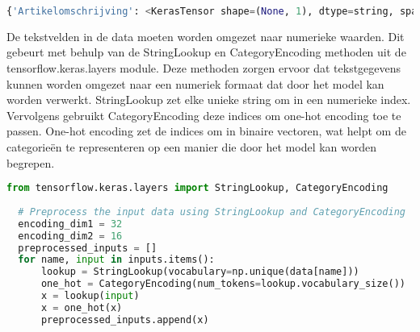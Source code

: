 \begin{lstlisting}[language=Python, caption={Uitkomst van de dictionary}]
  {'Artikelomschrijving': <KerasTensor shape=(None, 1), dtype=string, sparse=None, name=Artikelomschrijving>, 'Artikelomschrijving.1': <KerasTensor shape=(None, 1), dtype=string, sparse=None, name=Artikelomschrijving.1>, 'Voorts.gem.prijs': <KerasTensor shape=(None, 1), dtype=string, sparse=None, name=Voorts.gem.prijs>}
\end{lstlisting}

De tekstvelden in de data moeten worden omgezet naar numerieke waarden. Dit gebeurt met behulp van de StringLookup en CategoryEncoding methoden uit de tensorflow.keras.layers module. Deze methoden zorgen ervoor dat tekstgegevens kunnen worden omgezet naar een numeriek formaat dat door het model kan worden verwerkt. StringLookup zet elke unieke string om in een numerieke index. Vervolgens gebruikt CategoryEncoding deze indices om one-hot encoding toe te passen. One-hot encoding zet de indices om in binaire vectoren, wat helpt om de categorieën te representeren op een manier die door het model kan worden begrepen.
\begin{lstlisting}[language=Python, caption={Omzetten van tekstvelden naar numerieke waarden}]
  from tensorflow.keras.layers import StringLookup, CategoryEncoding
  
  # Preprocess the input data using StringLookup and CategoryEncoding
  encoding_dim1 = 32
  encoding_dim2 = 16
  preprocessed_inputs = []
  for name, input in inputs.items():
      lookup = StringLookup(vocabulary=np.unique(data[name]))
      one_hot = CategoryEncoding(num_tokens=lookup.vocabulary_size())
      x = lookup(input)
      x = one_hot(x)
      preprocessed_inputs.append(x)
\end{lstlisting}


\section{}%
\label{sec:AutoencoderModelPOC}

